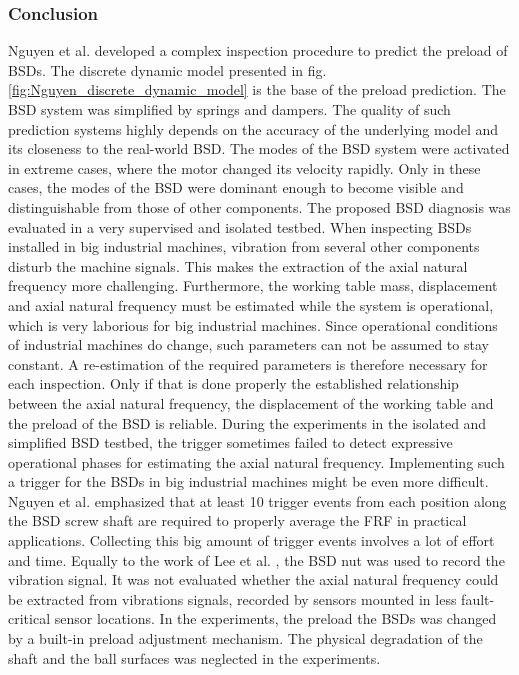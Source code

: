 \subsubsection{Conclusion}
Nguyen et al. \cite{NGUYEN2019} developed a complex inspection procedure to predict the preload of BSDs. The discrete dynamic model presented in fig. \ref{fig:Nguyen_discrete_dynamic_model} is the base of the preload prediction. The BSD system was simplified by springs and dampers. The quality of such prediction systems highly depends on the accuracy of the underlying model and its closeness to the real-world BSD. The modes of the BSD system were activated in extreme cases, where the motor changed its velocity rapidly. Only in these cases, the modes of the BSD were dominant enough to become visible and distinguishable from those of other components. The proposed BSD diagnosis was evaluated in a very supervised and isolated testbed. When inspecting BSDs installed in big industrial machines, vibration from several other components disturb the machine signals. This makes the extraction of the axial natural frequency more challenging. Furthermore, the working table mass, displacement and axial natural frequency must be estimated while the system is operational, which is very laborious for big industrial machines. Since operational conditions of industrial machines do change, such parameters can not be assumed to stay constant. A re-estimation of the required parameters is therefore necessary for each inspection. Only if that is done properly the established relationship between the axial natural frequency, the displacement of the working table and the preload of the BSD is reliable. During the experiments in the isolated and simplified BSD testbed, the trigger sometimes failed to detect expressive operational phases for estimating the axial natural frequency. Implementing such a trigger for the BSDs in big industrial machines might be even more difficult. Nguyen et al. \cite{NGUYEN2019} emphasized that at least 10 trigger events from each position along the BSD screw shaft are required to properly average the FRF in practical applications. Collecting this big amount of trigger events involves a lot of effort and time. Equally to the work of Lee et al. \cite{Lee2015}, the BSD nut was used to record the vibration signal. It was not evaluated whether the axial natural frequency could be extracted from vibrations signals, recorded by sensors mounted in less fault-critical sensor locations. In the experiments, the preload the BSDs was changed by a built-in preload adjustment mechanism. The physical degradation of the shaft and the ball surfaces was neglected in the experiments.

